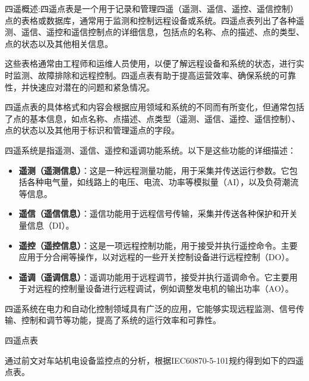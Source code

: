 四遥概述:四遥点表是一个用于记录和管理四遥（遥测、遥信、遥控、遥信控制）点的表格或数据库，通常用于监测和控制远程设备或系统。四遥点表列出了各种遥测、遥信、遥控和遥信控制点的详细信息，包括点的名称、点的描述、点的类型、点的状态以及其他相关信息。

这些表格通常由工程师和运维人员使用，以便了解远程设备和系统的状态，进行实时监测、故障排除和远程控制。四遥点表有助于提高运营效率、确保系统的可靠性，并快速应对潜在的问题和紧急情况。

四遥点表的具体格式和内容会根据应用领域和系统的不同而有所变化，但通常包括了点的基本信息，如点名称、点描述、点类型（遥测、遥信、遥控、遥信控制）、点的状态以及其他用于标识和管理遥点的字段。

四遥系统是指遥测、遥信、遥控和遥调功能系统。以下是这些功能的详细描述：

\begin{itemize}
	\item \textbf{遥测（遥测信息）}：这是一种远程测量功能，用于采集并传送运行参数。它包括各种电气量，如线路上的电压、电流、功率等模拟量（AI），以及负荷潮流等信息。
	
	\item \textbf{遥信（遥信信息）}：遥信功能用于远程信号传输，采集并传送各种保护和开关量信息（DI）。
	
	\item \textbf{遥控（遥控信息）}：这是一项远程控制功能，用于接受并执行遥控命令。主要应用于分合闸等操作，以对远程的一些开关控制设备进行远程控制（DO）。
	
	\item \textbf{遥调（遥调信息）}：遥调功能用于远程调节，接受并执行遥调命令。它主要用于对远程的控制量设备进行远程调试，例如调整发电机的输出功率（AO）。
\end{itemize}

四遥系统在电力和自动化控制领域具有广泛的应用，它能够实现远程监测、信号传输、控制和调节等功能，提高了系统的运行效率和可靠性。

四遥点表

通过前文对车站机电设备监控点的分析，根据IEC60870-5-101规约得到如下的四遥点表。

